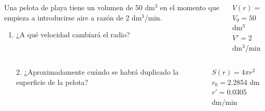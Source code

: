 \documentclass[aspectratio=169,10pt,t]{beamer}
\begin{document}
\begin{frame}
\begin{columns}
\begin{column}[T]{0.75\textwidth}
Una pelota de playa tiene un volumen de 50 dm$^3$ en el momento que empieza a introducirse aire a razón de 2 dm$^3$/min.
\begin{enumerate}
\item ¿A qué velocidad cambiará el radio?
\end{enumerate}
\end{column}
\quad
\begin{column}[T]{0.25\textwidth}
\begin{datos}
$V(r)=\frac{4}{3}\pi r^3$ \\
$V_0 = 50$ dm$^3$\\
$V' = 2$ dm$^3$/min
\end{datos}
\end{column}
\end{columns}
\end{frame}


\begin{frame}
\begin{columns}
\begin{column}[T]{0.75\textwidth}
\begin{enumerate}
\item[2.] ¿Aproximadamente cuándo se habrá duplicado la superficie de la pelota?
\end{enumerate}
\end{column}
\begin{column}[T]{0.25\textwidth}
\begin{datos}
$S(r)=4\pi r^2$\\
$r_0 = 2.2854$ dm\\
$r' = 0.0305$ dm/min
\end{datos}
\end{column}
\end{columns}
\end{frame}
\end{document}
